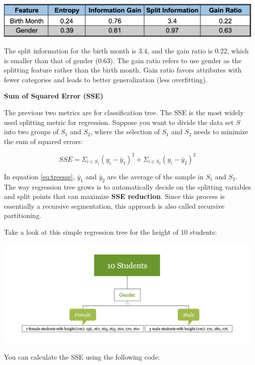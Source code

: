 \documentclass[12pt,]{krantz}
\begin{document}
\includegraphics{images/infogainratioexp2.png}

The split information for the birth month is 3.4, and the gain ratio is 0.22, which is smaller than that of gender (0.63). The gain ratio refers to use gender as the splitting feature rather than the birth month. Gain ratio favors attributes with fewer categories and leads to better generalization (less overfitting).

\textbf{Sum of Squared Error (SSE)}

The previous two metrics are for classification tree. The SSE is the most widely used splitting metric for regression. Suppose you want to divide the data set \(S\) into two groups of \(S_{1}\) and \(S_{2}\), where the selection of \(S_{1}\) and \(S_{2}\) needs to minimize the sum of squared errors:

\begin{equation}
SSE=\Sigma_{i\in S_{1}}(y_{i}-\bar{y}_{1})^{2}+\Sigma_{i\in S_{2}}(y_{i}-\bar{y}_{2})^{2}
\label{eq:treesse}
\end{equation}

In equation \eqref{eq:treesse}, \(\bar{y}_{1}\) and \(\bar{y}_{2}\) are the average of the sample in \(S_{1}\) and \(S_{2}\). The way regression tree grows is to automatically decide on the splitting variables and split points that can maximize \textbf{SSE reduction}. Since this process is essentially a recursive segmentation, this approach is also called recursive partitioning.

Take a look at this simple regression tree for the height of 10 students:

\includegraphics{images/varEN.png}

You can calculate the SSE using the following code:
\end{document}
